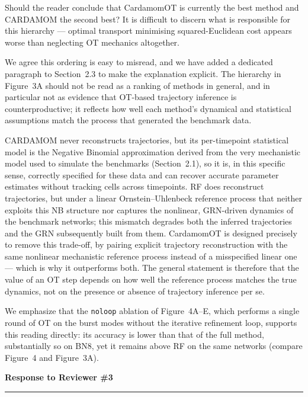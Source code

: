 \documentclass[11pt,a4paper]{article}
\newcounter{revtotal}   %
\newcounter{revlocal}   %
\newcommand{\currentreviewer}{}  %
\newcommand{\revcomment}[2]{%
  \stepcounter{revtotal}%
  \stepcounter{revlocal}%
  \edef\commentlabel{\currentreviewer.\arabic{revlocal}}%
  \begin{tcolorbox}[revstyle,
      title={\commentlabel\ $|$\ #1}]
    #2
  \end{tcolorbox}%
  \edef\lastcommentlabel{\commentlabel}%
}
\newcommand{\response}[1]{%
  \begin{tcolorbox}[respstyle,
      title={Response to \lastcommentlabel}]
    #1
  \end{tcolorbox}%
}
\renewcommand{\section}[1]{%
  \vspace{1.2em}%
  {\large\bfseries\color{secpurple} #1}\\[-0.4em]%
  {\color{secpurple}\rule{\linewidth}{0.8pt}}%
  \vspace{0.4em}%
}
\begin{document}
\revcomment{Nuanced discussion of the method hierarchy in Figure~3}{%
Should the reader conclude that CardamomOT is currently the best method and CARDAMOM the
second best? It is difficult to discern what is responsible for this hierarchy --- optimal
transport minimising squared-Euclidean cost appears worse than neglecting OT mechanics
altogether.}
\response{%
We agree this ordering is easy to misread, and we have added a dedicated paragraph to
Section~2.3 to make the explanation explicit. The hierarchy in Figure~3A should not be read as a
ranking of methods in general, and in particular not as evidence that OT-based trajectory
inference is counterproductive; it reflects how well each method's dynamical and statistical
assumptions match the process that generated the benchmark data.

CARDAMOM never reconstructs trajectories, but its per-timepoint statistical model is the
Negative Binomial approximation derived from the very mechanistic model used to simulate the
benchmarks (Section~2.1), so it is, in this specific sense, correctly specified for these data
and can recover accurate parameter estimates without tracking cells across timepoints. RF does
reconstruct trajectories, but under a linear Ornstein--Uhlenbeck reference process that neither
exploits this NB structure nor captures the nonlinear, GRN-driven dynamics of the benchmark
networks; this mismatch degrades both the inferred trajectories and the GRN subsequently built
from them. CardamomOT is designed precisely to remove this trade-off, by pairing explicit
trajectory reconstruction with the same nonlinear mechanistic reference process instead of a
misspecified linear one --- which is why it outperforms both. The general statement is therefore
that the value of an OT step depends on how well the reference process matches the true
dynamics, not on the presence or absence of trajectory inference per se.

We emphasize that the \texttt{noloop}
ablation of Figure~4A--E, which performs a single round of OT on the burst modes without the iterative
refinement loop, supports this reading directly: its accuracy is lower than that of the full method, substantially so on BN8, yet it remains above RF on the same networks (compare Figure~4 and Figure~3A).}


\section{Response to Reviewer \#3}
\end{document}
